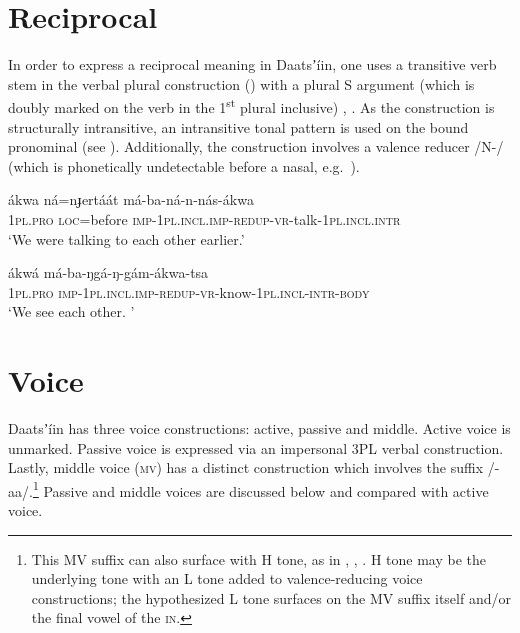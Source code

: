 \documentclass[output=paper]{langsci/langscibook}
\begin{document}
\section{Reciprocal}\label{sec:ahlandc:5}

In order to express a reciprocal meaning in Daatsʼ\'{i}in, one uses a transitive verb stem in the verbal plural construction () with a plural S argument (which is doubly marked on the verb in the 1\textsuperscript{st} plural inclusive) , . As the construction is structurally intransitive, an intransitive tonal pattern is used on the bound pronominal (see ). Additionally, the construction involves a valence reducer /N-/ (which is phonetically undetectable before a nasal, e.g.\ ).

\ea\label{ex:ahlandc:43}
\gll
\'{a}kwa     n\'{a}=nɟert\'{a}\'{a}t   m\'{a}-ba-n\'{a}-n-n\'{a}s-\'{a}kwa \\
1\textsc{pl.pro} \textsc{loc}=before     \textsc{imp-1pl.incl.imp}{}-\textsc{redup}{}-\textsc{vr}{}-talk-\textsc{1pl.incl.intr}\\
\glt
‘We were talking to each other earlier.’ 
\z

\ea\label{ex:ahlandc:44}
\gll
\'{a}kw\'{a}  m\'{a}-ba-ŋg\'{a}-ŋ-g\'{a}m-\'{a}kwa-tsa \\
1\textsc{pl.pro}   \textsc{imp-1pl.incl}.\textsc{imp}{}-\textsc{redup}{}-\textsc{vr-}know-\textsc{1pl.incl-intr-body} \\
\glt
 ‘We see each other. ’  
\z


\section{Voice}\label{sec:ahlandc:6}



Daatsʼ\'{i}in has three voice constructions: active, passive and middle. Active voice is unmarked. Passive voice is expressed via an impersonal 3PL verbal construction. Lastly, middle voice (\textsc{mv}) has a distinct construction which involves the suffix /-aa/.\footnote{This MV suffix can also surface with H tone, as in , , . H tone may be the underlying tone with an L tone added to valence-reducing voice constructions; the hypothesized L tone surfaces on the MV suffix itself and/or the final vowel of the \textsc{in}.} Passive and middle voices are discussed below and compared with active voice.
\end{document}
